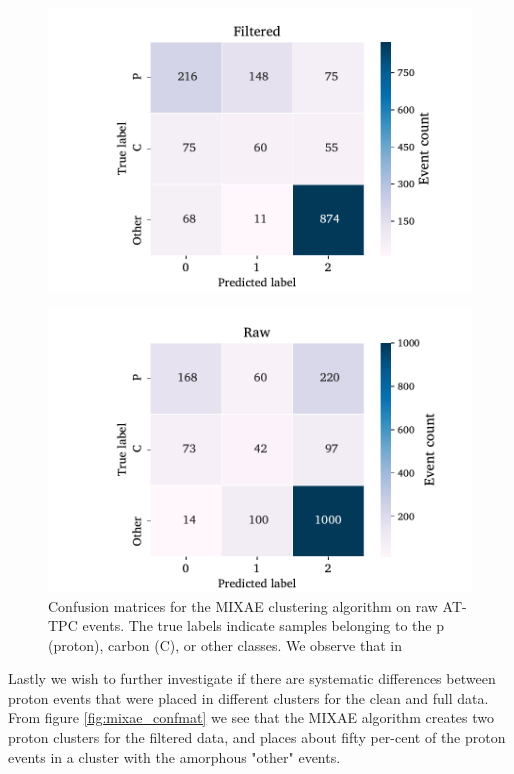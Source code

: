 \documentclass[review,number,sort&compress]{elsarticle}
\begin{document}
\begin{figure}
\centering
	\includegraphics[width=\textwidth]{custom_work/Filtered_mixae_conf_mat.pdf}
\caption{}\label{fig:mixae_confmat_filtered}
\end{figure}

\begin{figure}
\centering
	\includegraphics[width=\textwidth]{custom_work/Raw_mixae_conf_mat.pdf}
\caption[MIXAE - confusion matrices]{Confusion matrices for the MIXAE clustering algorithm on raw AT-TPC events. The true labels indicate samples belonging to the p (proton), carbon (C), or other classes. We observe that in }\label{fig:mixae_confmat_raw}
\end{figure}

Lastly we wish to further investigate if there are systematic differences between proton events that were placed in different clusters for the clean and full data. From figure \ref{fig:mixae_confmat} we see that the MIXAE algorithm creates two proton clusters for the filtered data, and places about fifty per-cent of the proton events in a cluster with the amorphous "other" events.
\end{document}
